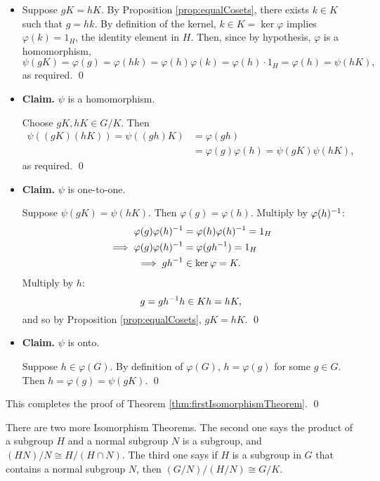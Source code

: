 \documentclass[../algebraNotesMSRI-UP2016.tex]{subfiles}
\begin{document}
\begin{frame}
\begin{itemize}
\item[] Suppose $gK=hK$.  By Proposition \ref{prop:equalCosets}, there exists $k\in K$ such that $g=hk$.  By definition of the kernel, $k\in K=\ker{\varphi}$ implies $\varphi(k)=1_{H}$, the identity element in $H$.  Then, since by hypothesis, $\varphi$ is a homomorphism,
\[
\psi(gK)=\varphi(g)=\varphi(hk)=\varphi(h)\varphi(k)=\varphi(h)\cdot 1_{H}=\varphi(h)=\psi(hK),
\]
as required.
\qed

\smallGap
\item \textbf{Claim.} $\psi$ is a homomorphism.

\smallGap
\pf Choose $gK,hK\in G/K$.  Then
\begin{align*}
\psi{\left((gK)(hK)\right)} = \psi{\left((gh)K\right)} &= \varphi(gh) \\
	&= \varphi(g)\varphi(h)=\psi{(gK)}\psi{(hK)},	
\end{align*}
as required.
\qed
\end{itemize}
\end{frame}

\begin{frame}
\begin{itemize}  
\item \textbf{Claim.} $\psi$ is one-to-one.

\smallGap
\pf Suppose $\psi(gK)=\psi(hK)$.  Then $\varphi(g)=\varphi(h)$.  Multiply by $\varphi(h)^{-1}$:
\begin{align*}
\varphi(g)\varphi(h)^{-1} &= \varphi(h)\varphi(h)^{-1}=1_{H} \\
\implies \varphi(g)\varphi(h)^{-1} &= \varphi(gh^{-1})= 1_H \\
\implies gh^{-1} &\in\ker{\varphi}=K.
\end{align*}
Multiply by $h$:%
\[
g=gh^{-1}h\in Kh=hK,
\] 
and so by Proposition \ref{prop:equalCosets}, $gK=hK$.
\qed
\end{itemize}
\end{frame}

\begin{frame}
\begin{itemize}
\item \textbf{Claim.} $\psi$ is onto.

\smallGap
\pf Suppose $h\in\varphi(G)$.  By definition of $\varphi(G)$, $h=\varphi(g)$ for some $g\in G$.  Then $h=\varphi(g)=\psi(gK)$.
\qed
\end{itemize}
This completes the proof of Theorem \ref{thm:firstIsomorphismTheorem}.
\qed

\smallGap 
There are two more Isomorphism Theorems.  The second one says the product of a subgroup $H$ and a normal subgroup $N$ is a subgroup, and $(HN)/N\cong H/(H\cap N)$.  The third one says if $H$ is a subgroup in $G$ that contains a normal subgroup $N$, then $(G/N)/(H/N)\cong G/K$.
\end{frame}
\end{document}
